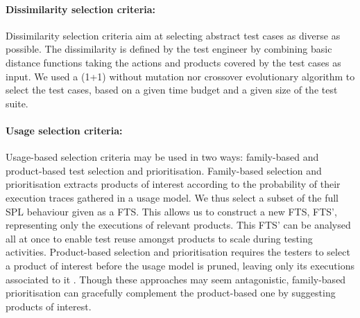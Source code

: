 \paragraph{Dissimilarity selection criteria:}

Dissimilarity selection criteria aim at selecting abstract test cases as diverse as possible. The dissimilarity is defined by the test engineer by combining basic distance functions taking the actions and products covered by the test cases as input. We used a (1+1) without mutation nor crossover evolutionary algorithm to select the test cases, based on a given time budget and a given size of the test suite.

\paragraph{Usage selection criteria:}

Usage-based selection criteria may be used in two ways: family-based and product-based test selection and prioritisation. Family-based selection and prioritisation extracts products of interest according to the probability of their execution traces gathered in a usage model.  We thus select a subset of the full SPL behaviour given as a \gls{FTS}. This allows us to construct a new FTS, FTS', representing only the executions of relevant products.  This FTS' can be analysed all at once to enable test reuse amongst products to scale during testing activities. Product-based selection and prioritisation requires the testers to select a product of interest before the usage model is pruned, leaving only its executions associated to it \cite{Samih2014b,Samih2014,Samih2014c}. Though these approaches may seem antagonistic, family-based prioritisation can gracefully complement the product-based one by suggesting products of interest.
